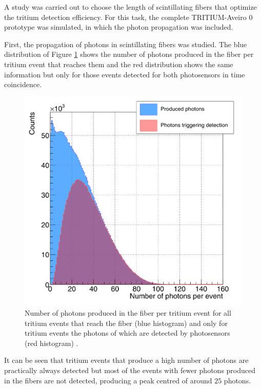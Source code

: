 A study was carried out to choose the length of scintillating fibers that optimize the tritium detection efficiency. For this task, the complete TRITIUM-Aveiro 0 prototype was simulated, in which the photon propagation was included.

First, the propagation of photons in scintillating fibers was studied. The blue distribution of Figure \ref{fig:PhotonsFibersYesNoPhotosensors} shows the number of photons produced in the fiber per tritium event that reaches them and the red distribution shows the same information but only for those events detected for both photosensors in time coincidence.

\begin{figure}[h]
\centering
\includegraphics[scale=0.3]{Figures/8SimulationsResults/81TRITIUMDesign/813Length/CollectionPhotonsInFibers.png}
\caption{Number of photons produced in the fiber per tritium event for all tritium events that reach the fiber (blue histogram) and only for tritium events the photons of which are detected by photosensors (red histogram) \cite{SimulationPaperCarlos}.\label{fig:PhotonsFibersYesNoPhotosensors}}
\end{figure}

It can be seen that tritium events that produce a high number of photons are practically always detected but most of the events with fewer photons produced in the fibers are not detected, producing a peak centred of around $25$ photons.  

